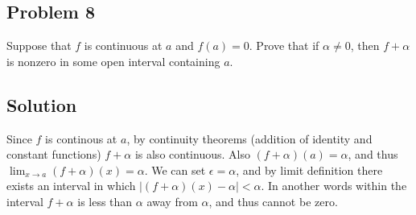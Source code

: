 \subsection*{Problem 8}
Suppose that $f$ is continuous at $a$ and $f(a)=0$. Prove that if $\alpha\neq 0$, then $f+\alpha$ is nonzero in some open interval containing $a$.

\subsection*{Solution}
Since $f$ is continous at $a$, by continuity theorems (addition of
identity and constant functions) $f+\alpha$ is also continuous. Also
$(f+\alpha)(a)=\alpha$, and thus $\lim_{x\to a}(f+\alpha)(x)=\alpha$. We can set
$\epsilon=\alpha$, and by limit definition there exists an interval in which
$|(f+\alpha)(x)-\alpha|<\alpha$. In another words within the interval $f+\alpha$ is less
than $\alpha$ away from $\alpha$, and thus cannot be zero.




